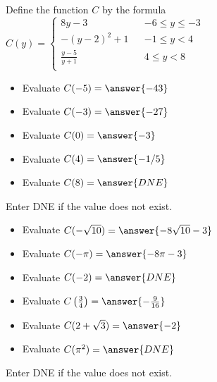 \documentclass{ximera}
\begin{document}
\begin{definition}
Define the function $C$ by the formula $C(y) =   
\left \{ \begin{aligned}     
8 y - 3 && -6 \leq y \leq -3 \\        
-(y-2)^2 + 1 && -1 \leq y < 4 \\      
\frac{y-5}{y+1} && 4 \leq y < 8\\       
\end{aligned} \right .$ 
\end{definition}






\begin{exercise}
\begin{itemize}
\item Evaluate $C(-5) = \answer{-43}$
\item Evaluate $C(-3) = \answer{-27}$
\item Evaluate $C(0) = \answer{-3}$
\item Evaluate $C(4) = \answer{-1/5}$
\item Evaluate $C(8) = \answer{DNE}$
\end{itemize}
Enter DNE if the value does not exist.
\end{exercise}






\begin{exercise}
\begin{itemize}
\item Evaluate $C(-\sqrt{10}) = \answer{-8\sqrt{10}-3}$
\item Evaluate $C(-\pi) = \answer{-8\pi-3}$
\item Evaluate $C(-2) = \answer{DNE}$
\item Evaluate $C\left(\frac{3}{4}\right) = \answer{-\frac{9}{16}}$
\item Evaluate $C(2+\sqrt{3}) = \answer{-2}$
\item Evaluate $C(\pi^2) = \answer{DNE}$
\end{itemize}
Enter DNE if the value does not exist.
\end{exercise}
\end{document}
